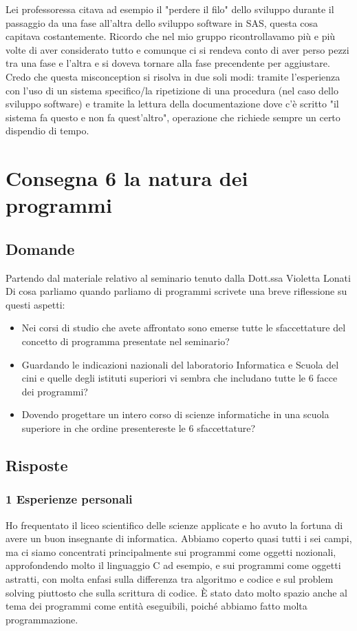 \documentclass[a4paper]{article}
\begin{document}
Lei professoressa citava ad esempio il "perdere il filo" dello sviluppo durante il passaggio da una fase all'altra dello sviluppo software in SAS, questa cosa capitava costantemente.
Ricordo che nel mio gruppo ricontrollavamo più e più volte di aver considerato tutto e comunque ci si rendeva conto di aver perso pezzi tra una fase e l'altra e si doveva tornare alla fase precendente per aggiustare.
Credo che questa misconception si risolva in due soli modi: tramite l'esperienza con l'uso di un sistema specifico/la ripetizione di una procedura (nel caso dello sviluppo software) e tramite la lettura della documentazione dove c'è scritto "il sistema fa questo e non fa quest'altro", operazione che richiede sempre un certo dispendio di tempo.

\section{Consegna 6 \large la natura dei programmi}

\subsection{Domande}
Partendo dal materiale relativo al seminario tenuto dalla Dott.ssa Violetta Lonati Di cosa parliamo quando parliamo di programmi scrivete una breve riflessione su questi aspetti:
\begin{itemize}
	\item Nei corsi di studio che avete affrontato sono emerse tutte le sfaccettature del concetto di programma presentate nel seminario?
	\item Guardando le indicazioni nazionali del laboratorio Informatica e Scuola del cini e quelle degli istituti superiori vi sembra che includano tutte le 6 facce dei programmi?
	\item Dovendo progettare un intero corso di scienze informatiche in una scuola superiore in che ordine presentereste le 6 sfaccettature?
\end{itemize}
\subsection{Risposte}
\subsubsection{1 Esperienze personali}
Ho frequentato il liceo scientifico delle scienze applicate e ho avuto la fortuna di avere un buon insegnante di informatica.
Abbiamo coperto quasi tutti i sei campi, ma ci siamo concentrati principalmente sui programmi come oggetti nozionali, approfondendo molto il linguaggio C ad esempio, e sui programmi come oggetti astratti, con molta enfasi sulla differenza tra algoritmo e codice e sul problem solving piuttosto che sulla scrittura di codice.
È stato dato molto spazio anche al tema dei programmi come entità eseguibili, poiché abbiamo fatto molta programmazione.
\end{document}
